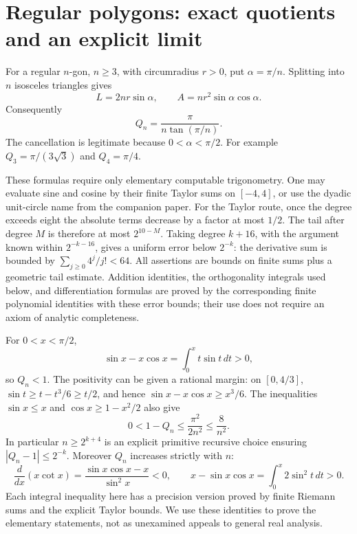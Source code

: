 \section{Regular polygons: exact quotients and an explicit limit}
\label{sec:regular-new}
For a regular \(n\)-gon, \(n\ge3\), with circumradius \(r>0\), put
\(\alpha=\pi/n\).  Splitting into \(n\) isosceles triangles gives
\[
 L=2nr\sin\alpha,\qquad A=nr^2\sin\alpha\cos\alpha.
\]
Consequently
\begin{equation}\label{eq:regular-quotient}
             Q_n=\frac{\pi}{n\tan(\pi/n)}.
\end{equation}
The cancellation is legitimate because \(0<\alpha<\pi/2\).
For example \(Q_3=\pi/(3\sqrt3)\) and \(Q_4=\pi/4\).

These formulas require only elementary computable trigonometry.  One
may evaluate sine and cosine by their finite Taylor sums on
\([-4,4]\), or use the dyadic unit-circle name from the companion
paper.  For the Taylor route, once the degree exceeds eight the
absolute terms decrease by a factor at most \(1/2\).  The tail after
degree \(M\) is therefore at most \(2^{10-M}\).  Taking degree
\(k+16\), with the argument known within \(2^{-k-16}\), gives a
uniform error below \(2^{-k}\): the derivative sum is bounded by
\(\sum_{j\ge0}4^j/j!<64\).  All assertions are bounds on finite
sums plus a geometric tail estimate.  Addition identities, the
orthogonality integrals used below, and differentiation formulas are
proved by the corresponding finite polynomial identities with these
error bounds; their use does not require an axiom of analytic
completeness.

For \(0<x<\pi/2\),
\[
 \sin x-x\cos x=\int_0^x t\sin t\,dt>0,
\]
so \(Q_n<1\).  The positivity can be given a rational margin:
on \([0,4/3]\), \(\sin t\ge t-t^3/6\ge t/2\), and hence
\(\sin x-x\cos x\ge x^3/6\).
The inequalities \(\sin x\le x\) and
\(\cos x\ge1-x^2/2\) also give
\begin{equation}\label{eq:regular-rate}
             0<1-Q_n\le\frac{\pi^2}{2n^2}\le\frac8{n^2}.
\end{equation}
In particular \(n\ge2^{k+4}\) is an explicit primitive recursive
choice ensuring \(|Q_n-1|\le2^{-k}\).
Moreover \(Q_n\) increases strictly with \(n\):
\[
 \frac{d}{dx}(x\cot x)
   =\frac{\sin x\cos x-x}{\sin^2x}<0,
 \qquad
 x-\sin x\cos x=\int_0^x2\sin^2t\,dt>0.
\]
Each integral inequality here has a precision version proved by
finite Riemann sums and the explicit Taylor bounds.  We use these
identities to prove the elementary statements, not as unexamined
appeals to general real analysis.


